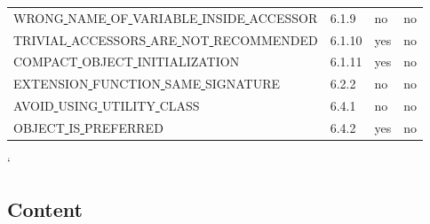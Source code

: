 \begin{longtable}{ |l|p{0.8cm}|p{0.8cm}| p{3cm} | }
WRONG\underline{ }NAME\underline{ }OF\underline{ }VARIABLE\underline{ }INSIDE\underline{ }ACCESSOR & 6.1.9 &  no  &   no \\
TRIVIAL\underline{ }ACCESSORS\underline{ }ARE\underline{ }NOT\underline{ }RECOMMENDED & 6.1.10 &  yes  &   no  \\
COMPACT\underline{ }OBJECT\underline{ }INITIALIZATION & 6.1.11 &  yes  &   no  \\
EXTENSION\underline{ }FUNCTION\underline{ }SAME\underline{ }SIGNATURE & 6.2.2 &  no  &   no  \\
AVOID\underline{ }USING\underline{ }UTILITY\underline{ }CLASS & 6.4.1 &  no  &  no \\
OBJECT\underline{ }IS\underline{ }PREFERRED & 6.4.2 &  yes  &  no \\
\hline
\end{longtable}
\lstMakeShortInline[basicstyle=\ttfamily\bfseries]`





\subsection*{\textbf{Content}}



